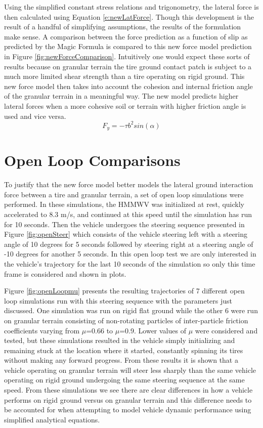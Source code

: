 \documentclass[12pt,onecolumn]{report}
\begin{document}
Using the simplified constant stress relations and trigonometry, the lateral force is then calculated using Equation \ref{e:newLatForce}. Though this development is the result of a handful of simplifying assumptions, the results of the formulation make sense. A comparison between the force prediction as a function of slip as predicted by the Magic Formula is compared to this new force model prediction in Figure \ref{fig:newForceComparison}. Intuitively one would expect these sorts of results because on granular terrain the tire ground contact patch is subject to a much more limited shear strength than a tire operating on rigid ground. This new force model then takes into account the cohesion and internal friction angle of the granular terrain in a meaningful way. The new model predicts higher lateral forces when a more cohesive soil or terrain with higher friction angle is used and vice versa. 
%
\begin{equation}\label{e:newLatForce}
F_y = -\tau b^2 sin\left(\alpha\right)
\end{equation}

\section{Open Loop Comparisons}\label{s:OpenLoop}

To justify that the new force model better models the lateral ground interaction force between a tire and granular terrain, a set of open loop simulations were performed. In these simulations, the HMMWV was initialized at rest, quickly accelerated to 8.3 m/s, and continued at this speed until the simulation has run for 10 seconds. Then the vehicle undergoes the steering sequence presented in Figure \ref{fig:openSteer} which consists of the vehicle steering left with a steering angle of 10 degrees for 5 seconds followed by steering right at a steering angle of -10 degrees for another 5 seconds. In this open loop test we are only interested in the vehicle's trajectory for the last 10 seconds of the simulation so only this time frame is considered and shown in plots.

Figure \ref{fig:openLoopmu} presents the resulting trajectories of 7 different open loop simulations run with this steering sequence with the parameters just discussed. One simulation was run on rigid flat ground while the other 6 were run on granular terrain consisting of non-rotating particles of inter-particle friction coefficients varying from $\mu$=0.66 to $\mu$=0.9. Lower values of $\mu$ were considered and tested, but these simulations resulted in the vehicle simply initializing and remaining stuck at the location where it started, constantly spinning its tires without making any forward progress. From these results it is shown that a vehicle operating on granular terrain will steer less sharply than the same vehicle operating on rigid ground undergoing the same steering sequence at the same speed. From these simulations we see there are clear differences in how a vehicle performs on rigid ground versus on granular terrain and this difference needs to be accounted for when attempting to model vehicle dynamic performance using simplified analytical equations. 
\end{document}
